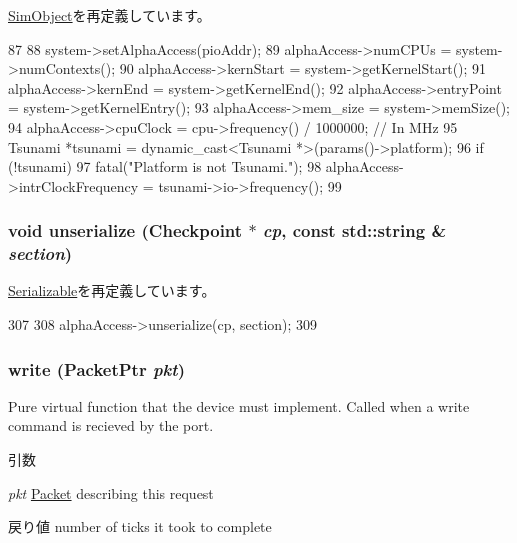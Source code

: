 \hyperlink{classSimObject_aecc7d8debf54990ffeaaed5bac7d7d81}{SimObject}を再定義しています。


\begin{DoxyCode}
87 {
88     system->setAlphaAccess(pioAddr);
89     alphaAccess->numCPUs = system->numContexts();
90     alphaAccess->kernStart = system->getKernelStart();
91     alphaAccess->kernEnd = system->getKernelEnd();
92     alphaAccess->entryPoint = system->getKernelEntry();
93     alphaAccess->mem_size = system->memSize();
94     alphaAccess->cpuClock = cpu->frequency() / 1000000; // In MHz
95     Tsunami *tsunami = dynamic_cast<Tsunami *>(params()->platform);
96     if (!tsunami)
97         fatal("Platform is not Tsunami.\n");
98     alphaAccess->intrClockFrequency = tsunami->io->frequency();
99 }
\end{DoxyCode}
\hypertarget{classAlphaBackdoor_af22e5d6d660b97db37003ac61ac4ee49}{
\subsubsection[{unserialize}]{\setlength{\rightskip}{0pt plus 5cm}void unserialize ({\bf Checkpoint} $\ast$ {\em cp}, \/  const std::string \& {\em section})}}
\label{classAlphaBackdoor_af22e5d6d660b97db37003ac61ac4ee49}


\hyperlink{classSerializable_af100c4e9feabf3cd918619c88c718387}{Serializable}を再定義しています。


\begin{DoxyCode}
307 {
308     alphaAccess->unserialize(cp, section);
309 }
\end{DoxyCode}
\hypertarget{classAlphaBackdoor_a4cefab464e72b5dd42c003a0a4341802}{
\subsubsection[{write}]{ write ({\bf PacketPtr} {\em pkt})}}
\label{classAlphaBackdoor_a4cefab464e72b5dd42c003a0a4341802}
Pure virtual function that the device must implement. Called when a write command is recieved by the port. 
\begin{DoxyParams}{引数}
\item[{\em pkt}]\hyperlink{classPacket}{Packet} describing this request \end{DoxyParams}
\begin{DoxyReturn}{戻り値}
number of ticks it took to complete 
\end{DoxyReturn}


